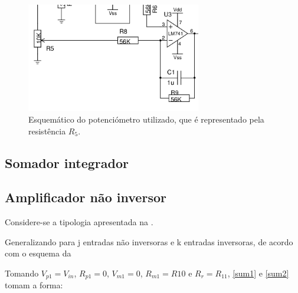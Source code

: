 \documentclass[%
  reprint,
  nofootinbib,
  amsmath,amssymb,
  aps,
  10pt,
  a4paper
]{revtex4-1}
\begin{document}
\begin{figure}[h]
\includegraphics[width=3in]{../img/ref.png}
\caption{Esquemático do potenciómetro utilizado, que é representado pela resistência $R_5$.}
\label{fig:tensaoreferencia}
\end{figure}




\subsection{Somador integrador}







\subsection{Amplificador não inversor}

Considere-se a tipologia apresentada na .




Generalizando para j entradas não inversoras e k entradas inversoras, de acordo com o esquema da 

Tomando $V_{p1}=V_{in}$, $R_{p1}=0$, $V_{m1}=0$, $R_{m1}=R10$ e $R_r = R_{11}$, \eqref{sum1} e \eqref{sum2} tomam a forma:
\end{document}
